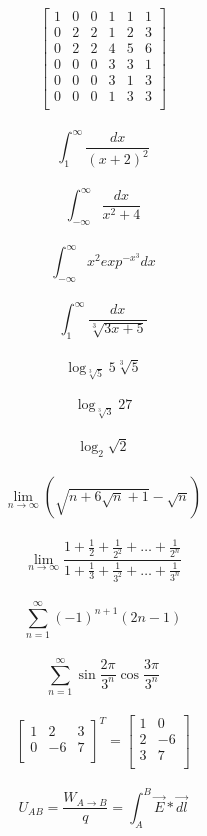 \documentclass[20pt, letterpaper, titlepage]{article}
\begin{document}
\begin{LARGE}
$$
\left[ \begin{array}{c|cc|ccc}
1 & 0 & 0 & 1 & 1 & 1\\ \hline
0 & 2 & 2 & 1 & 2 & 3\\
0 & 2 & 2 & 4 & 5 & 6\\ \hline
0 & 0 & 0 & 3 & 3 & 1\\
0 & 0 & 0 & 3 & 1 & 3\\
0 & 0 & 0 & 1 & 3 & 3\\
\end{array} \right]
$$\\

$$
\int_{1}^\infty \frac{dx}{(x+ 2)^2}
$$\\

$$
\int_{-\infty}^\infty \frac{dx}{x^2 + 4}
$$\\

$$
\int_{-\infty}^\infty x^2 exp^{{-x}^3} dx
$$\\

$$
\int_{1}^\infty \frac{dx}{\sqrt[3]{3x + 5}} 
$$\\

$$
\log_{\sqrt[3]{5}} 5\sqrt[3]{5}
$$\\

$$
\log_{\sqrt[3]{3}} 27
$$\\

$$
\log_2 \sqrt{2}
$$\\

$$
\lim_{n\to\infty} \left( \sqrt{n + 6 \sqrt{n} + 1}- \sqrt{n} \right)$$\\
$$
\lim_{n\to\infty}  \frac{{1 + \frac{1}{2}} + \frac{1}{2^2} + \ldots + \frac{1}{2^n}} {1 + \frac{1}{3} + \frac{1}{3^2} + \ldots + \frac{1}{3^n}}$$\\

$$
\sum_{n = 1}^\infty (-1)^{n+1} (2n -1) 
$$\\

$$
\sum_{n = 1}^\infty \sin \frac{2\pi}{3^n} \cos \frac{3\pi}{3^n}
$$\\

$$
\left[ \begin{array}{ccc}
1 & 2 & 3\\
0 & -6 & 7\\
\end{array} \right]^T
=
\left[ \begin{array}{cc}
1 & 0\\
2 & -6\\
3 & 7\\
\end{array} \right]
$$\\

$$
U_{AB} = \frac{W_{A \rightarrow B}}{q} = \int_A^B \vec{E} * \vec{dl}
$$\\
\end{LARGE}
\end{document}

